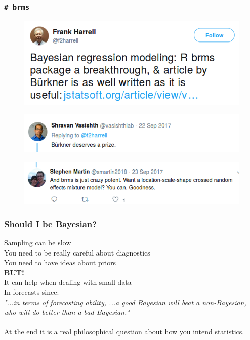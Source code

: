 \documentclass[handout]{beamer}\usepackage[]{graphicx}\usepackage[]{color}
\begin{document}
\begin{frame}
\frametitle{\texttt{\# brms}}
\pause
\begin{figure}
\includegraphics[scale=0.3]{Twitter1.png}
\end{figure}
\pause
\begin{figure}
\includegraphics[scale=0.4]{Twitter2.png}
\end{figure}
\pause
\begin{figure}
\includegraphics[scale=0.4]{Twitter3.png}
\end{figure}
\end{frame}


\begin{frame}
\frametitle{Should I be Bayesian?}
\pause
Sampling can be slow \\
\pause
You need to be really careful about diagnostics \\
\pause
You need to have ideas about priors\\
\pause
\textbf{BUT!}\\
\pause
It can help when dealing with small data \\
\pause 
In forecasts since:\\
\textit{"...in terms of forecasting ability, ...a good Bayesian will beat a non-Bayesian, who will do better than a bad Bayesian."} \\
[C.W.J. Granger (1986, p. 16)]\\
\pause
At the end it is a real philosophical question about how you intend statistics. \\

\end{frame}
\end{document}
